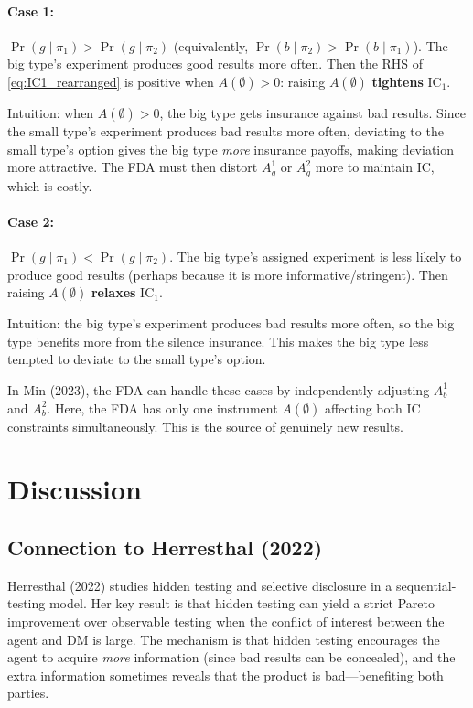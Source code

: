 \documentclass[12pt,a4paper]{article}
\begin{document}
\paragraph{Case 1:}
$\Pr(g \mid \pi_1) > \Pr(g \mid \pi_2)$ (equivalently,
$\Pr(b \mid \pi_2) > \Pr(b \mid \pi_1)$). The big type's
experiment produces good results more often. Then the RHS
of \eqref{eq:IC1_rearranged} is positive when
$A(\emptyset) > 0$: raising $A(\emptyset)$
\textbf{tightens} IC$_1$.

Intuition: when $A(\emptyset) > 0$, the big type gets
insurance against bad results. Since the small type's
experiment produces bad results more often, deviating to the
small type's option gives the big type \emph{more} insurance
payoffs, making deviation more attractive. The FDA must then
distort $A_g^1$ or $A_g^2$ more to maintain IC, which is
costly.

\paragraph{Case 2:}
$\Pr(g \mid \pi_1) < \Pr(g \mid \pi_2)$. The big type's
assigned experiment is less likely to produce good results
(perhaps because it is more informative/stringent). Then
raising $A(\emptyset)$ \textbf{relaxes} IC$_1$.

Intuition: the big type's experiment produces bad results
more often, so the big type benefits more from the silence
insurance. This makes the big type less tempted to deviate to
the small type's option.

\medskip
In Min (2023), the FDA can handle these cases by independently
adjusting $A_b^1$ and $A_b^2$. Here, the FDA has only one
instrument $A(\emptyset)$ affecting both IC constraints
simultaneously. This is the source of genuinely new results.


\section{Discussion}
\label{sec:discussion}

\subsection{Connection to Herresthal (2022)}

Herresthal (2022) studies hidden testing and selective
disclosure in a sequential-testing model. Her key result is
that hidden testing can yield a strict Pareto improvement over
observable testing when the conflict of interest between the
agent and DM is large. The mechanism is that hidden testing
encourages the agent to acquire \emph{more} information (since
bad results can be concealed), and the extra information
sometimes reveals that the product is bad---benefiting both
parties.
\end{document}
